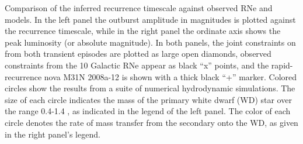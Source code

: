 \label{fig:RecurrentNovaRecurrenceComparison}
Comparison of the inferred \spock recurrence timescale against
observed RNe and models.  In the left panel the outburst amplitude in
magnitudes is plotted against the recurrence timescale, while in the
right panel the ordinate axis shows the peak luminosity (or absolute
magnitude).  In both panels, the joint constraints on \spock from both
transient episodes are plotted as large open diamonds, observed
constraints from the 10 Galactic RNe appear as black ``x'' points, and
the rapid-recurrence nova M31N 2008a-12 is shown with a thick black
``+'' marker.  Colored circles show the results from a suite of
numerical hydrodynamic simulations\citet{Yaron:2005}.  The size
of each circle indicates the mass of the primary white dwarf (WD) star
over the range 0.4-1.4 \Msun, as indicated in the legend of the
left panel.  The color of each circle denotes the rate of mass
transfer from the secondary onto the WD, as given in the right panel's
legend.

  
